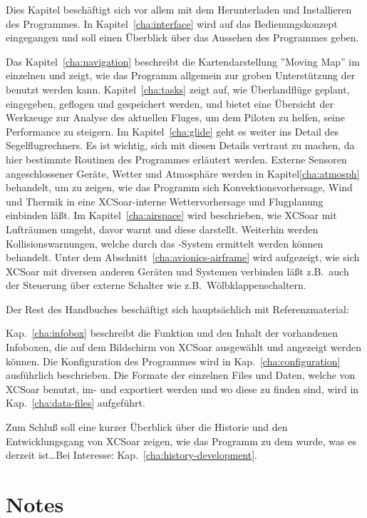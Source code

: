 Dies Kapitel beschäftigt sich vor allem mit dem Herunterladen und Installieren des Programmes. 
In Kapitel~\ref{cha:interface} wird auf das Bedienungskonzept eingegangen und soll einen Überblick über das Aussehen des Programmes geben.

Das Kapitel~\ref{cha:navigation} beschreibt die Kartendarstellung ''Moving Map'' im einzelnen  und zeigt, wie das Programm allgemein 
zur groben Unterstützung der benutzt werden kann. Kapitel~\ref{cha:tasks} zeigt auf, wie Überlandflüge geplant, eingegeben, geflogen und gespeichert werden, und bietet eine Übersicht
der Werkzeuge zur Analyse des aktuellen Fluges, um dem Piloten zu helfen,  seine Performance zu steigern.
Im Kapitel~\ref{cha:glide} geht es weiter ins Detail des Segelflugrechners. 
Es ist wichtig, sich mit diesen Details vertraut zu machen, da hier bestimmte Routinen des Programmes erläutert werden.
Externe Sensoren angeschlossener Geräte, Wetter und Atmosphäre werden in Kapitel\ref{cha:atmosph} behandelt, um zu zeigen, wie das Programm 
sich Konvektionsvorhersage, Wind und Thermik in eine \textsf{XCSoar}-interne Wettervorhersage und Flugplanung einbinden läßt.  
Im Kapitel~\ref{cha:airspace} wird beschrieben, wie \textsf{XCSoar} mit Lufträumen umgeht, davor warnt und diese darstellt. 
Weiterhin werden Kollisionswarnungen, welche durch das \fl-System ermittelt werden können behandelt.
Unter dem Abschnitt~\ref{cha:avionics-airframe} wird aufgezeigt, wie sich \textsf{XCSoar} mit diversen anderen Geräten und Systemen 
verbinden läßt z.B.\ auch der Steuerung über externe Schalter wie z.B.\ Wölbklappenschaltern. 

Der Rest des Handbuches beschäftigt sich hauptsächlich mit Referenzmaterial:

Kap.~\ref{cha:infobox} beschreibt die Funktion und den Inhalt der vorhandenen Infoboxen, die auf dem Bildschirm von \textsf{XCSoar} ausgewählt und angezeigt werden können.
Die Konfiguration des Programmes wird in Kap.~\ref{cha:configuration} ausführlich beschrieben. 
Die Formate der einzelnen Files und Daten, welche von \textsf{XCSoar} benutzt, im- und exportiert werden und wo diese zu finden sind, 
wird in Kap.~\ref{cha:data-files} aufgeführt. 

Zum Schluß soll eine kurzer Überblick über die Historie und den Entwicklungsgang von \textsf{XCSoar} zeigen, wie das Programm zu dem wurde, was 
es derzeit ist\dots Bei Interesse: Kap.~\ref{cha:history-development}.

\section{Notes}


